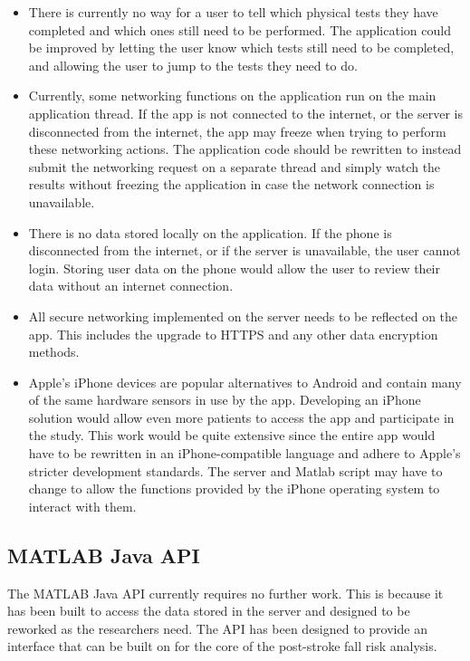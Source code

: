 \documentclass[conference]{IEEEtran}
\begin{document}
\begin{itemize}
    \item There is currently no way for a user to tell which physical tests they have completed and which ones still need to be performed. The application could be improved by letting the user know which tests still need to be completed, and allowing the user to jump to the tests they need to do. 
    \item Currently, some networking functions on the application run on the main application thread. If the app is not connected to the internet, or the server is disconnected from the internet, the app may freeze when trying to perform these networking actions. The application code should be rewritten to instead submit the networking request on a separate thread and simply watch the results without freezing the application in case the network connection is unavailable. 
    \item There is no data stored locally on the application. If the phone is disconnected from the internet, or if the server is unavailable, the user cannot login. Storing user data on the phone would allow the user to review their data without an internet connection. 
    \item All secure networking implemented on the server needs to be reflected on the app. This includes the upgrade to HTTPS and any other data encryption methods. 
    \item Apple's iPhone devices are popular alternatives to Android and contain many of the same hardware sensors in use by the app. Developing an iPhone solution would allow even more patients to access the app and participate in the study. This work would be quite extensive since the entire app would have to be rewritten in an iPhone-compatible language and adhere to Apple's stricter development standards. The server and Matlab script may have to change to allow the functions provided by the iPhone operating system to interact with them. 
\end{itemize}

\subsection{MATLAB Java API}

The MATLAB Java API currently requires no further work. This is because it has been built to access the data stored in the server and designed to be reworked as the researchers need. The API has been designed to provide an interface that can be built on for the core of the post-stroke fall risk analysis.
\end{document}
